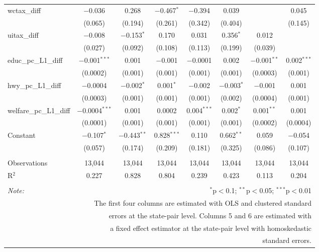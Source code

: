 \begin{table}[!htbp]
\begin{tabular}{@{\extracolsep{5pt}}lccccccc}
  wctax\_diff & $-$0.036 & 0.268 & $-$0.467$^{*}$ & $-$0.394 & 0.039 &  & 0.045 \\ 
  & (0.065) & (0.194) & (0.261) & (0.342) & (0.404) &  & (0.145) \\ 
  uitax\_diff & $-$0.008 & $-$0.153$^{*}$ & 0.170 & 0.031 & 0.356$^{*}$ & 0.012 &  \\ 
  & (0.027) & (0.092) & (0.108) & (0.113) & (0.199) & (0.039) &  \\ 
  educ\_pc\_L1\_diff & $-$0.001$^{***}$ & 0.001 & $-$0.001 & $-$0.0001 & 0.002 & $-$0.001$^{**}$ & 0.002$^{***}$ \\ 
  & (0.0002) & (0.001) & (0.001) & (0.001) & (0.001) & (0.0003) & (0.001) \\ 
  hwy\_pc\_L1\_diff & $-$0.0004 & $-$0.002$^{*}$ & 0.001$^{*}$ & $-$0.002 & $-$0.003$^{*}$ & $-$0.001 & 0.001 \\ 
  & (0.0003) & (0.001) & (0.001) & (0.001) & (0.002) & (0.0004) & (0.001) \\ 
  welfare\_pc\_L1\_diff & $-$0.0004$^{***}$ & 0.001 & 0.0002 & 0.004$^{***}$ & 0.002$^{*}$ & 0.001$^{**}$ & 0.001 \\ 
  & (0.0001) & (0.001) & (0.001) & (0.001) & (0.001) & (0.0002) & (0.0004) \\ 
  Constant & $-$0.107$^{*}$ & $-$0.443$^{**}$ & 0.828$^{***}$ & 0.110 & 0.662$^{**}$ & 0.059 & $-$0.054 \\ 
  & (0.057) & (0.174) & (0.209) & (0.181) & (0.325) & (0.086) & (0.107) \\ 
 \hline \\[-1.8ex] 
Observations & 13,044 & 13,044 & 13,044 & 13,044 & 13,044 & 13,044 & 13,044 \\ 
R$^{2}$ & 0.227 & 0.828 & 0.804 & 0.239 & 0.423 & 0.113 & 0.204 \\ 
\hline 
\hline \\[-1.8ex] 
\textit{Note:}  & \multicolumn{7}{r}{$^{*}$p$<$0.1; $^{**}$p$<$0.05; $^{***}$p$<$0.01} \\ 
 & \multicolumn{7}{r}{The first four columns are estimated with OLS and clustered standard} \\ 
 & \multicolumn{7}{r}{ errors at the state-pair level. Columns 5 and 6 are estimated with} \\ 
 & \multicolumn{7}{r}{a fixed effect estimator at the state-pair level with homoskedastic} \\ 
 & \multicolumn{7}{r}{standard errors.} \\ 
\end{tabular} 
\end{table} 
